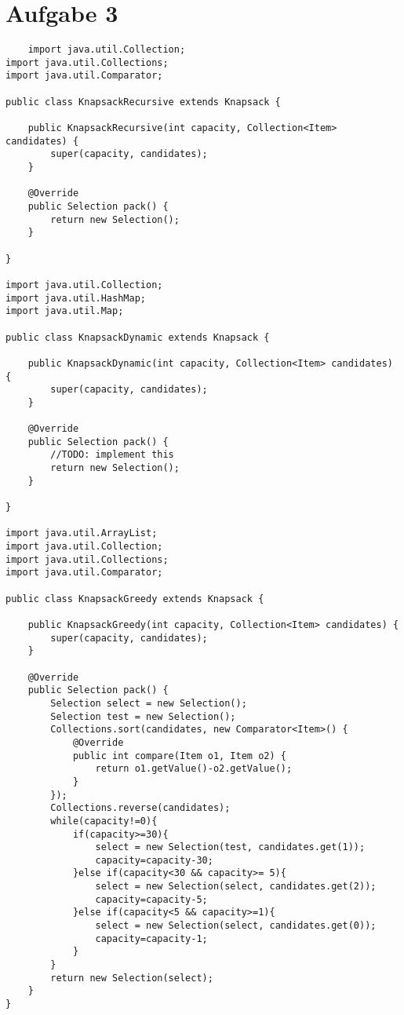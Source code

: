 \documentclass[12pt,a4paper,oneside,ngerman]{article}
\begin{document}
\section*{Aufgabe 3}
\begin{lstlisting}
    import java.util.Collection;
import java.util.Collections;
import java.util.Comparator;

public class KnapsackRecursive extends Knapsack {

	public KnapsackRecursive(int capacity, Collection<Item> candidates) {
		super(capacity, candidates);
	}

	@Override
	public Selection pack() {
		return new Selection();
	}

}

import java.util.Collection;
import java.util.HashMap;
import java.util.Map;

public class KnapsackDynamic extends Knapsack {
	
	public KnapsackDynamic(int capacity, Collection<Item> candidates) {
		super(capacity, candidates);
	}

	@Override
	public Selection pack() {
		//TODO: implement this
		return new Selection();
	}

}

import java.util.ArrayList;
import java.util.Collection;
import java.util.Collections;
import java.util.Comparator;

public class KnapsackGreedy extends Knapsack {

	public KnapsackGreedy(int capacity, Collection<Item> candidates) {
		super(capacity, candidates);
	}

	@Override
	public Selection pack() {
		Selection select = new Selection();
		Selection test = new Selection();
		Collections.sort(candidates, new Comparator<Item>() {
			@Override
			public int compare(Item o1, Item o2) {
				return o1.getValue()-o2.getValue();
			}
		});
		Collections.reverse(candidates);
		while(capacity!=0){
			if(capacity>=30){
				select = new Selection(test, candidates.get(1));
				capacity=capacity-30;
			}else if(capacity<30 && capacity>= 5){
				select = new Selection(select, candidates.get(2));
				capacity=capacity-5;
			}else if(capacity<5 && capacity>=1){
				select = new Selection(select, candidates.get(0));
				capacity=capacity-1;
			}
		}
		return new Selection(select);
	}
}

\end{lstlisting}
\end{document}

